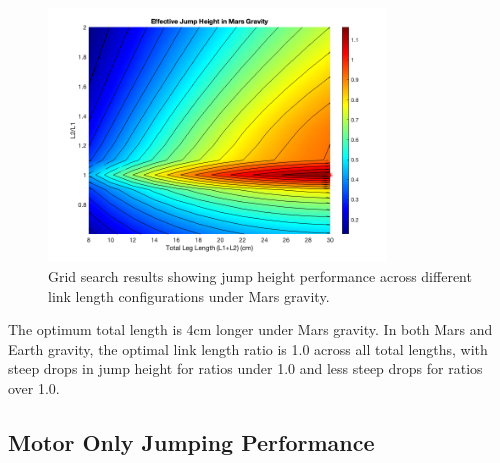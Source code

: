 \begin{figure}[h]
    \centering
    \includegraphics[width=0.8\textwidth]{Images/results/grid_search_results_mars_flat.png}
    \caption{Grid search results showing jump height performance across different link length configurations under Mars gravity.}
    \label{fig:results:grid_search_mars}
\end{figure}

The optimum total length is 4cm longer under Mars gravity. In both Mars and Earth gravity, the optimal link length ratio is 1.0 across all total lengths, with steep drops in jump height for ratios under 1.0 and less steep drops for ratios over 1.0. 

\subsection{Motor Only Jumping Performance}
